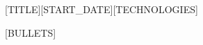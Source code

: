 \sideProjectHeading
{[TITLE]}{[START_DATE]}{[TECHNOLOGIES]}
\resumeBullets

[BULLETS]

\resumeBulletsEnd